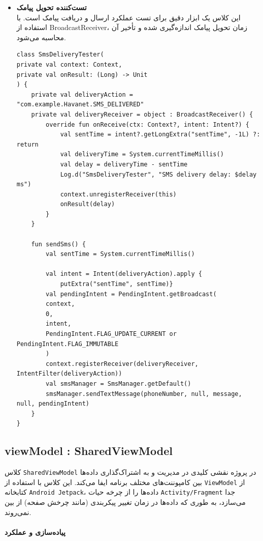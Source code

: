 \documentclass{report}
\begin{document}
\begin{itemize}
\begin{note}
\end{note}
	\item \textbf{تست‌کننده تحویل پیامک}\\
	این کلاس یک ابزار دقیق برای تست عملکرد ارسال و دریافت پیامک است. با استفاده از BroadcastReceiver، زمان تحویل پیامک اندازه‌گیری شده و تأخیر آن محاسبه می‌شود.
	
	\begin{lstlisting}[caption=SmsDeliveryTester.kt]
class SmsDeliveryTester(
private val context: Context,
private val onResult: (Long) -> Unit
) {
	private val deliveryAction = "com.example.Havanet.SMS_DELIVERED"
	private val deliveryReceiver = object : BroadcastReceiver() {
		override fun onReceive(ctx: Context?, intent: Intent?) {
			val sentTime = intent?.getLongExtra("sentTime", -1L) ?: return
			val deliveryTime = System.currentTimeMillis()
			val delay = deliveryTime - sentTime
			Log.d("SmsDeliveryTester", "SMS delivery delay: $delay ms")
			context.unregisterReceiver(this)
			onResult(delay)
		}
	}
	
	fun sendSms() {
		val sentTime = System.currentTimeMillis()
		
		val intent = Intent(deliveryAction).apply {
			putExtra("sentTime", sentTime)}
		val pendingIntent = PendingIntent.getBroadcast(
		context,
		0,
		intent,
		PendingIntent.FLAG_UPDATE_CURRENT or PendingIntent.FLAG_IMMUTABLE
		)
		context.registerReceiver(deliveryReceiver, IntentFilter(deliveryAction))
		val smsManager = SmsManager.getDefault()
		smsManager.sendTextMessage(phoneNumber, null, message, null, pendingIntent)
	}
}

	\end{lstlisting}
	
\end{itemize}
\subsection{ viewModel :  SharedViewModel}
کلاس \texttt{SharedViewModel} در پروژه نقشی کلیدی در مدیریت و به اشتراک‌گذاری داده‌ها بین کامپوننت‌های مختلف برنامه ایفا می‌کند. این کلاس با استفاده از \texttt{ViewModel} از کتابخانه \texttt{Android Jetpack}، داده‌ها را از چرخه حیات \texttt{Activity/Fragment} جدا می‌سازد، به طوری که داده‌ها در زمان تغییر پیکربندی (مانند چرخش صفحه) از بین نمی‌روند.

\paragraph{پیاده‌سازی و عملکرد}
\end{document}
